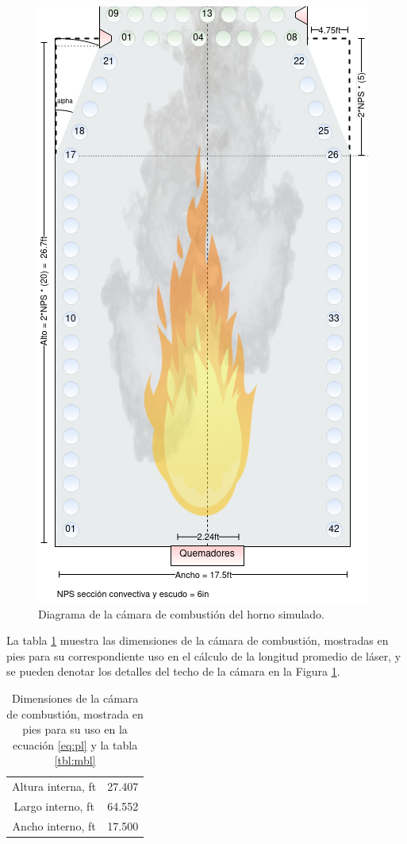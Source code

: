 \begin{figure}[hbt]
\begin{center}
\includegraphics[scale=0.45]{images/firebox}
\caption[Diagrama de la cámara de combustión algoritmo]{Diagrama de la cámara de combustión del horno simulado.}
\label{fig:firebox}
\end{center}
\end{figure}

\par La tabla \ref{tbl:firebox} muestra las dimensiones de la cámara de combustión, mostradas en pies para su correspondiente uso en el cálculo de la longitud promedio de láser, y se pueden denotar los detalles del techo de la cámara en la Figura \ref{fig:firebox}.

\begin{table}
\begin{center}
\caption[Dimensiones de la cámara de combustión]{Dimensiones de la cámara de combustión, mostrada en pies para su uso en la ecuación \ref{eq:pl} y la tabla \ref{tbl:mbl}}
\label{tbl:firebox}
\begin{tabular}{c|c}
Altura interna, ft	& 27.407 \\
Largo interno, ft 	& 64.552 \\
Ancho interno, ft 	& 17.500 \\
\end{tabular}
\end{center}
\end{table}

